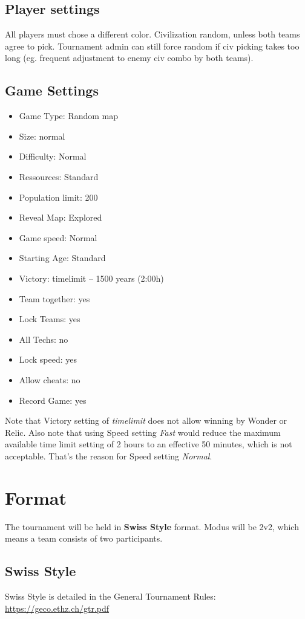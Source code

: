 \documentclass{article}
\begin{document}
\subsection{Player settings}
All players must chose a different color. Civilization random, unless both teams agree to pick. Tournament admin can still force random if civ picking takes too long (eg. frequent adjustment to enemy civ combo by both teams).

\subsection{Game Settings}
\begin{itemize}[noitemsep]
\item Game Type: Random map
\item Size: normal
\item Difficulty: Normal
\item Ressources: Standard
\item Population limit: 200
\item Reveal Map: Explored
\item Game speed: Normal
\item Starting Age: Standard
\item Victory: timelimit – 1500 years (2:00h)
\item Team together: yes
\item Lock Teams: yes
\item All Techs: no
\item Lock speed: yes
\item Allow cheats: no
\item Record Game: yes
\end{itemize}

Note that Victory setting of \textit{timelimit} does not allow winning by Wonder or Relic. Also note that using Speed setting \textit{Fast} would reduce the maximum available time limit setting of 2 hours to an effective 50 minutes, which is not acceptable. That's the reason for Speed setting \textit{Normal}.

\newpage

\section{Format}
The tournament will be held in \textbf{Swiss Style} format. Modus will be 2v2, which means a team consists of two participants.

\subsection{Swiss Style}
Swiss Style is detailed in the General Tournament Rules:\\
\url{https://geco.ethz.ch/gtr.pdf}
\end{document}
